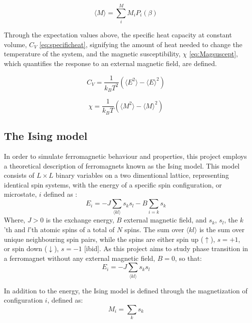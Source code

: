 \documentclass[%
oneside,                 %
final,                   %
10pt]{article}
\begin{document}
\begin{equation}
\langle M \rangle=\sum_i^M M_i P_i (\beta)
\label{eq:Magnetization}
\end{equation}

Through the expectation values above, the specific heat capacity at constant volume, $C_V$ \eqref{eq:specificheat}, signifying the amount of heat needed to change the temperature of the system, and the magnetic susceptibility, $\chi$ \eqref{eq:Magsuscept}, which quantifies the response to an external magnetic field, are defined. 

\begin{equation}
C_V=\frac{1}{k_B T^2} (\langle E^2 \rangle - \langle E \rangle^2 )
\label{eq:specificheat}
\end{equation}

\begin{equation}
\chi=\frac{1}{k_B T}(\langle M^2 \rangle - \langle M \rangle^2 )
\label{eq:Magsuscept}
\end{equation}	

\subsection{The Ising model}   
\label{SS:Ising}	
In order to simulate ferromagnetic behaviour and properties, this project employs a theoretical description of ferromagnets known as the Ising model. This model consists of $L \times L$ binary variables on a two dimentional lattice, representing identical spin systems, with the energy of a specific spin configuration, or microstate, $i$ defined as \cite{Fitzpatrick}:
\begin{equation}
E_i=-J\sum_{\langle kl \rangle} s_k s_l -B \sum_{i=k} s_k
\end{equation} 
Where, $J>0$ is the exchange energy, $B$ external magnetic field, and $s_k$, $s_l$, the $k$'th and $l$'th atomic spins of a total of $N$ spins. The sum over ${\langle kl \rangle}$ is the sum over unique neighbouring spin pairs, while the spins are either spin up ($\uparrow $), $s=+1$, or spin down ($\downarrow $), $s=-1$ [ibid].  As this project aims to study phase transition in a ferromagnet without any external magnetic field, $B=0$, so that:
\begin{equation}
E_i=-J\sum_{\langle kl \rangle} s_k s_l 
\label{eq:IsingEnergy}
\end{equation} 

In addition to the energy, the Ising model is defined through the magnetization of configuration $i$, defined as:
\begin{equation}
M_i=\sum_{k} s_k  
\end{equation}
\end{document}
